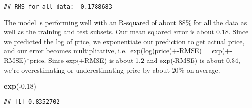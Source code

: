 \documentclass[]{article}
\newenvironment{Shaded}{\begin{snugshade}}{\end{snugshade}}
\newcommand{\KeywordTok}[1]{\textcolor[rgb]{0.13,0.29,0.53}{\textbf{#1}}}
\newcommand{\DecValTok}[1]{\textcolor[rgb]{0.00,0.00,0.81}{#1}}
\newcommand{\FloatTok}[1]{\textcolor[rgb]{0.00,0.00,0.81}{#1}}
\newcommand{\StringTok}[1]{\textcolor[rgb]{0.31,0.60,0.02}{#1}}
\newcommand{\OperatorTok}[1]{\textcolor[rgb]{0.81,0.36,0.00}{\textbf{#1}}}
\newcommand{\NormalTok}[1]{#1}
\begin{document}
\begin{Shaded}
\end{Shaded}

\begin{verbatim}
## RMS for all data:  0.1788683
\end{verbatim}

The model is performing well with an R-squared of about 88\% for all the
data as well as the training and test subsets. Our mean squared error is
about 0.18. Since we predicted the log of price, we exponentiate our
prediction to get actual price, and our error becomes multiplicative,
i.e.~exp(log(price)+-RMSE) = exp(+-RMSE)*price. Since exp(+RMSE) is
about 1.2 and exp(-RMSE) is about 0.84, we're overestimating or
underestimating price by about 20\% on average.

\begin{Shaded}
\begin{Highlighting}[]
\KeywordTok{exp}\NormalTok{(}\OperatorTok{-}\FloatTok{0.18}\NormalTok{)}
\end{Highlighting}
\end{Shaded}

\begin{verbatim}
## [1] 0.8352702
\end{verbatim}
\end{document}
